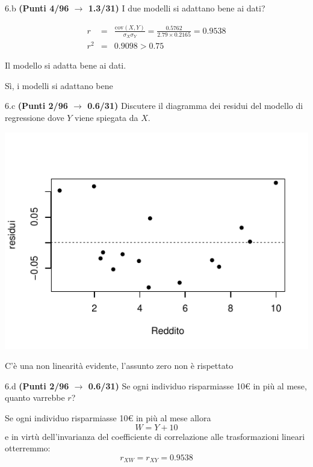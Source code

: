 \documentclass[
  11pt,
]{book}
\theoremstyle{mytheoremstyle}
\theoremstyle{mydefstyle}
\newenvironment{sol}
  {
  \begin{tcolorbox}[enhanced,breakable,arc=0.1mm,boxrule=1pt,colback=white,colframe=iblue,
  title=\bf \fontfamily{lmss}\selectfont \hspace{.5 cm} Soluzione,drop fuzzy shadow]

}{
\end{tcolorbox}
  }
\begin{document}
6.b \textbf{(Punti 4/96 \(\rightarrow\) 1.3/31)} I due modelli si adattano bene ai dati?

\begin{sol}
\begin{eqnarray*}
r&=&\frac{\text{cov}(X,Y)}{\sigma_X\sigma_Y}=\frac{ 0.5762 }{ 2.79 \times 0.2165 }= 0.9538 \\ 
r^2&=& 0.9098 > 0.75
\end{eqnarray*}

Il modello si adatta bene ai dati.

Sì, i modelli si adattano bene

\end{sol}

6.c \textbf{(Punti 2/96 \(\rightarrow\) 0.6/31)} Discutere il diagramma dei residui del modello di regressione dove \(Y\) viene spiegata da \(X\).

\begin{center}\includegraphics{Esami_passati_con_soluzioni_files/figure-latex/2021-74-1} \end{center}

\begin{sol}
C'è una non linearità evidente, l'assunto zero non è rispettato

\end{sol}

6.d \textbf{(Punti 2/96 \(\rightarrow\) 0.6/31)} Se ogni individuo risparmiasse 10€ in più al mese, quanto varrebbe \(r\)?

\begin{sol}
Se ogni individuo risparmiasse 10€ in più al mese allora
\[
W=Y+10
\]
e in virtù dell'invarianza del coefficiente di correlazione alle trasformazioni lineari otterremmo:
\[
r_{XW}=r_{XY}=0.9538
\]

\end{sol}
\end{document}
